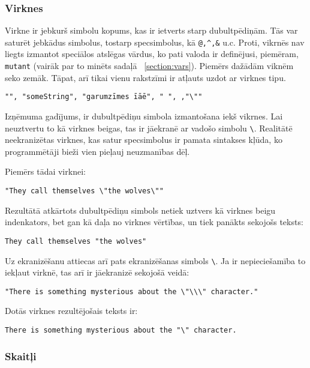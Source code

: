 \documentclass[12pt,a4paper]{report}
\begin{document}
\subsubsection{Virknes}
Virkne ir jebkurš simbolu kopums, kas ir ietverts starp dubultpēdiņām.
Tās var saturēt jebkādus simbolus, tostarp specsimbolus, kā \texttt{@,\^\space,\&} u.c. Proti, vikrnēs nav liegts izmantot speciālos atslēgas vārdus, ko pati valoda ir definējusi, piemēram, \texttt{mutant} (vairāk par to minēts sadaļā ~\ref{section:vars}).
Piemērs dažādām viknēm seko zemāk. Tāpat, arī tikai vienu rakstzīmi ir atļauts uzdot ar virknes tipu.

\begin{verbatim}
"", "someString", "garumzīmes īāē", " ", ,"\""
\end{verbatim}

Izņēmuma gadījums, ir dubultpēdiņu simbola izmantošana iekš vikrnes. Lai neuztvertu to kā virknes beigas, tas ir jāekranē ar vadošo simbolu \texttt{\textbackslash}. Realitātē neekranizētas virknes, kas satur specsimbolus ir pamata sintakses kļūda, ko programmētāji bieži vien pieļauj neuzmanības dēļ. 

Piemērs tādai virknei:

\begin{verbatim}
"They call themselves \"the wolves\""
\end{verbatim}

Rezultātā atkārtots dubultpēdiņu simbols netiek uztvers kā virknes beigu indenkators, bet gan kā daļa no virknes vērtības, un tiek panākts sekojošs teksts:

\begin{verbatim}
They call themselves "the wolves"
\end{verbatim}

Uz ekranizēšanu attiecas arī pats ekranizēšanas simbols \texttt{\textbackslash}. Ja ir nepieciešamība to iekļaut virknē, tas arī ir jāekranizē sekojošā veidā:

\begin{verbatim}
"There is something mysterious about the \"\\\" character."
\end{verbatim}

Dotās virknes rezultējošais teksts ir: 

\begin{verbatim}
There is something mysterious about the "\" character.
\end{verbatim}

\subsubsection{Skaitļi}
\end{document}
